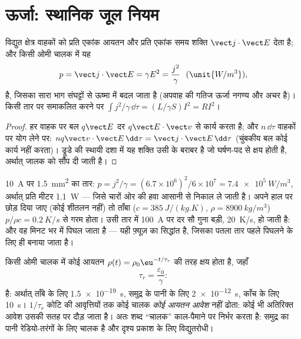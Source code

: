 \section{ऊर्जा: स्थानिक जूल नियम}

\begin{proposition}[स्थानिक जूल नियम]\label{prop:b2:charges-currents-conduction:joule}
विद्युत क्षेत्र वाहकों को प्रति एकांक आयतन और प्रति एकांक समय
शक्ति $\vect j\cdot\vect E$ देता है; और किसी ओमी चालक में यह
\[
p = \vect j\cdot\vect E = \gamma E^2 = \frac{j^2}\gamma \ \ (\unit{W/m^3}) ,
\]
है, जिसका सारा भाग संघट्टों से ऊष्मा में बदल जाता है (अपवाह की गतिज ऊर्जा
नगण्य और अचर है)। किसी तार पर समाकलित करने पर $\int j^2/\gamma\,\dd\tau
= (L/\gamma S)I^2 = RI^2$।
\end{proposition}

\begin{proof}
हर वाहक पर बल $q\vect E$ दर $q\vect E\cdot\vect v$ से कार्य करता है;
और $n\,\dd\tau$ वाहकों पर योग लेने पर: $nq\vect v\cdot\vect E\,\dd\tau = \vect j\cdot
\vect E\,\dd\tau$ (चुंबकीय बल कोई कार्य नहीं करता)। ड्रूडे की स्थायी
दशा में यह शक्ति उसी के बराबर है जो घर्षण-पद से क्षय होती है, अर्थात्
जालक को सौंप दी जाती है।
\end{proof}

\begin{example}[गरम होता तार]\label{ex:b2:charges-currents-conduction:heating}
\qty{10}{A} पर \qty{1.5}{mm^2} का तार: $p = j^2/\gamma = (6.7 \times 10^6)^2/6 \times 10^7 =
\qty{7.4e5}{W/m^3}$, अर्थात् प्रति मीटर \qty{1.1}{W} --- जिसे चारों ओर की हवा आसानी से
निकाल ले जाती है। अपने हाल पर छोड़ दिया जाए (कोई शीतलन नहीं) तो ताँबा ($c = \qty{385}{J/(kg.K)}$,
$\rho = \qty{8900}{kg/m^3}$) $p/\rho c = \qty{0.2}{K/s}$ से गरम होता। उसी तार में \qty{100}{A}
पर दर सौ गुना बड़ी, \qty{20}{K/s}, हो जाती है: और वह
मिनट भर में पिघल जाता है --- यही फ़्यूज़ का सिद्धांत है, जिसका पतला तार
पहले पिघलने के लिए ही बनाया जाता है।
\end{example}

\begin{proposition}[किसी चालक में आवेश का शिथिलन]\label{prop:b2:charges-currents-conduction:relaxation}
किसी ओमी चालक में कोई आयतन  $\rho(t) =
\rho_0\eu^{-t/\tau_r}$ की तरह क्षय होता है, जहाँ
\[
\tau_r = \frac{\varepsilon_0}{\gamma} :
\]
है: अर्थात् ताँबे के लिए \qty{1.5e-19}{s}, समुद्र के पानी के लिए \qty{2e-12}{s}, काँच के लिए \qty{10}{s}।
$1/\tau_r$ कोटि की आवृत्तियों तक कोई चालक \emph{कोई आयतन
आवेश} नहीं ढोता: कोई भी अतिरिक्त आवेश उसकी सतह पर दौड़ जाता है। अतः शब्द
``चालक'' काल-पैमाने पर निर्भर करता है: समुद्र का पानी रेडियो-तरंगों के लिए चालक
है और दृश्य प्रकाश के लिए विद्युतरोधी।
\end{proposition}

